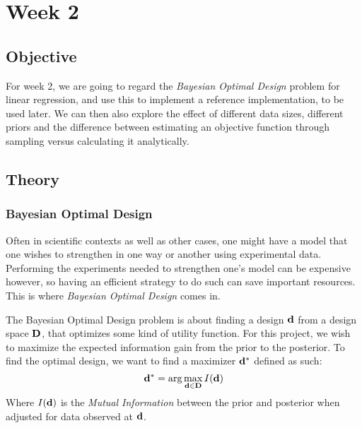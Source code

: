 \section{Week 2}
\subsection{Objective}
For week 2, we are going to regard the \textit{Bayesian Optimal Design} problem for linear regression, and use this to implement a reference implementation, to be used later.
We can then also explore the effect of different data sizes, different priors and the difference between estimating an objective function through sampling versus calculating it analytically.
\subsection{Theory}
\subsubsection{Bayesian Optimal Design}
Often in scientific contexts as well as other cases, one might have a model that one wishes to strengthen in one way or another using experimental data.
Performing the experiments needed to strengthen one's model can be expensive however, so having an efficient strategy to do such can save important resources.
This is where \textit{Bayesian Optimal Design} comes in.

The Bayesian Optimal Design problem is about finding a design $\mathbf{d}$ from a design space $\mathbf{D}$, that optimizes some kind of utility function.\cite{ryan15} 
For this project, we wish to maximize the expected information gain from the prior to the posterior.
To find the optimal design, we want to find a maximizer $\mathbf{d}^*$ defined as such:
\begin{equation}\label{eq:bayesian-optimal}\mathbf{d}^* = \arg \max_{\mathbf{d}\in \mathbf{D}} I(\mathbf{d})\end{equation}
Where $I(\mathbf{d})$ is the \textit{Mutual Information} between the prior and posterior when adjusted for data observed at $\mathbf{d}$.\\
